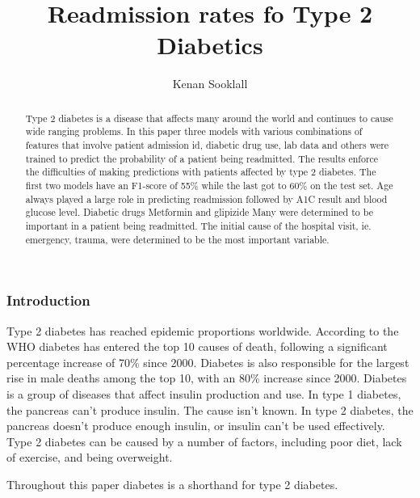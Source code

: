 \documentclass[5p]{elsarticle} %
\begin{document}
\begin{frontmatter}

  \title{Readmission rates fo Type 2 Diabetics}
    \author[CUNY-SPS]{Kenan Sooklall%
  }
  
  \begin{abstract}
  Type 2 diabetes is a disease that affects many around the world and
  continues to cause wide ranging problems. In this paper three models
  with various combinations of features that involve patient admission
  id, diabetic drug use, lab data and others were trained to predict the
  probability of a patient being readmitted. The results enforce the
  difficulties of making predictions with patients affected by type 2
  diabetes. The first two models have an F1-score of 55\% while the last
  got to 60\% on the test set. Age always played a large role in
  predicting readmission followed by A1C result and blood glucose level.
  Diabetic drugs Metformin and glipizide Many were determined to be
  important in a patient being readmitted. The initial cause of the
  hospital visit, ie. emergency, trauma, were determined to be the most
  important variable.
  \end{abstract}
  
 \end{frontmatter}

\hypertarget{introduction}{%
\subsubsection{Introduction}\label{introduction}}

Type 2 diabetes has reached epidemic proportions worldwide. According to
the WHO diabetes has entered the top 10 causes of death, following a
significant percentage increase of 70\% since 2000. Diabetes is also
responsible for the largest rise in male deaths among the top 10, with
an 80\% increase since 2000. Diabetes is a group of diseases that affect
insulin production and use. In type 1 diabetes, the pancreas can't
produce insulin. The cause isn't known. In type 2 diabetes, the pancreas
doesn't produce enough insulin, or insulin can't be used effectively.
Type 2 diabetes can be caused by a number of factors, including poor
diet, lack of exercise, and being overweight.

Throughout this paper diabetes is a shorthand for type 2 diabetes.
\end{document}
